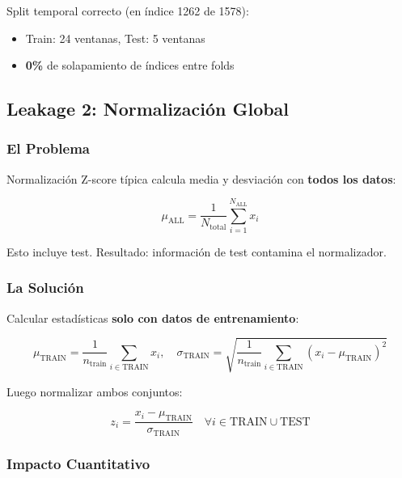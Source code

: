 \documentclass[11pt,twoside,a4paper]{article}
\begin{document}
Split temporal correcto (en índice 1262 de 1578):
\begin{itemize}
    \item Train: 24 ventanas, Test: 5 ventanas
    \item \textbf{0\%} de solapamiento de índices entre folds
\end{itemize}

\subsection{Leakage 2: Normalización Global}

\subsubsection{El Problema}

Normalización Z-score típica calcula media y desviación con \textbf{todos los datos}:

\begin{equation}
\mu_{\text{ALL}} = \frac{1}{N_{\text{total}}} \sum_{i=1}^{N_{\text{ALL}}} x_i
\end{equation}

Esto incluye test. Resultado: información de test contamina el normalizador.

\subsubsection{La Solución}

Calcular estadísticas \textbf{solo con datos de entrenamiento}:

\begin{equation}
\mu_{\text{TRAIN}} = \frac{1}{n_{\text{train}}} \sum_{i \in \text{TRAIN}} x_i, \quad
\sigma_{\text{TRAIN}} = \sqrt{\frac{1}{n_{\text{train}}} \sum_{i \in \text{TRAIN}} (x_i - \mu_{\text{TRAIN}})^2}
\end{equation}

Luego normalizar ambos conjuntos:

\begin{equation}
z_i = \frac{x_i - \mu_{\text{TRAIN}}}{\sigma_{\text{TRAIN}}} \quad \forall i \in \text{TRAIN} \cup \text{TEST}
\end{equation}

\subsubsection{Impacto Cuantitativo}
\end{document}
